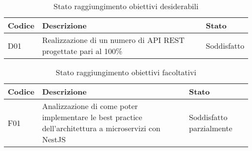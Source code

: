 \clearpage
\begin{table}[H]
    \begin{tabular}{|p{1.5cm}|p{7.7cm}|p{2cm}|} 
    \hline
    \textbf{Codice} & \textbf{Descrizione} & \textbf{Stato} \\ 
    \hline
    D01 & Realizzazione di un numero di \gls{API} \gls{REST} progettate pari al 100\%  & Soddisfatto \\
    \hline
    \end{tabular}
    \caption{Stato raggiungimento obiettivi desiderabili}
\end{table}
\begin{table}[H]
    \begin{tabular}{|p{1.5cm}|p{7.7cm}|p{2cm}|} 
    \hline
    \textbf{Codice} & \textbf{Descrizione} & \textbf{Stato} \\ 
    \hline
    F01 & Analizzazione di come poter implementare le best practice dell'architettura a microservizi con NestJS & Soddisfatto parzialmente \\
    \hline
    \end{tabular}
    \caption{Stato raggiungimento obiettivi facoltativi}
\end{table}

